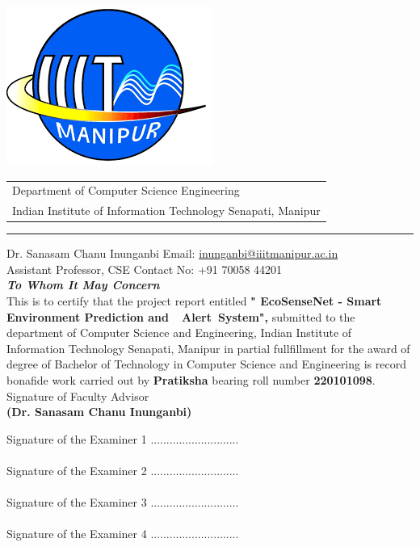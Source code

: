 \documentclass[a4paper,11pt,oneside]{report}
\begin{document}
\begin{center}
	\thispagestyle{empty}

		\begin{table}
			\centering
			\includegraphics[scale=0.2]{report_file/iiit manipur.png}
			\begin{tabular}{l}
				Department of Computer Science Engineering \\
				Indian Institute of Information Technology Senapati, Manipur \\
			\end{tabular}
		\end{table}
		\par\noindent\rule{\textwidth}{0.4pt}
			Dr. Sanasam Chanu Inunganbi
			\hspace*{\fill} Email: \href{mailto:inunganbi@iiitmanipur.ac.in}{inunganbi@iiitmanipur.ac.in}\\
			Assistant Professor, CSE
			\hspace*{0pt}\hfill Contact No: +91 70058 44201\\[2cm]
			{\Huge \textbf{\emph{To Whom It May Concern}}}\\[2cm]
			\linespread{1.13}
			\large{This is to certify that the project report
                entitled \textbf{" EcoSenseNet - Smart Environment Prediction and  Alert System",} submitted to the department of Computer Science and Engineering, Indian Institute of Information Technology Senapati, Manipur in partial fullfillment for the award of degree of Bachelor of Technology in Computer Science and Engineering is record bonafide work carried out by \textbf{Pratiksha} bearing roll number \textbf{220101098}.}\\[2.0cm]
			\hspace*{2.1in}\large{Signature of Faculty Advisor}\\
			\hspace*{2in}\textbf{(Dr. Sanasam Chanu Inunganbi)}

	\end{center}
        \vspace{0.5cm}
	Signature of the Examiner 1 ............................\\\\
	Signature of the Examiner 2 ............................\\\\
	Signature of the Examiner 3 ............................\\\\
	Signature of the Examiner 4 ............................\\\\
\end{document}
